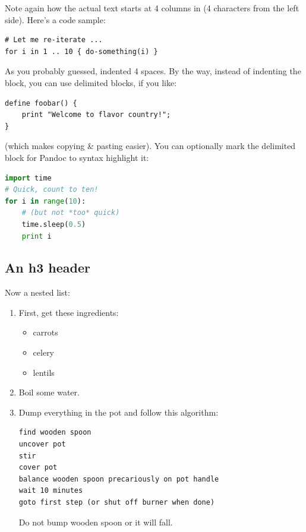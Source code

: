\documentclass[11pt,twoside,makeidx,hidelinks,]{memoir}
\begin{document}
Note again how the actual text starts at 4 columns in (4 characters
from the left side). Here's a code sample:

\begin{verbatim}# Let me re-iterate ...
for i in 1 .. 10 { do-something(i) }
\end{verbatim}

As you probably guessed, indented 4 spaces. By the way, instead of
indenting the block, you can use delimited blocks, if you like:

\begin{verbatim}define foobar() {
    print "Welcome to flavor country!";
}
\end{verbatim}

(which makes copying \& pasting easier). You can optionally mark the
delimited block for Pandoc to syntax highlight it:

\begin{lstlisting}[showspaces=false,showtabs=false,language=python,basicstyle=\ttfamily\footnotesize,columns=fixed,frame=tlbr]
import time
# Quick, count to ten!
for i in range(10):
    # (but not *too* quick)
    time.sleep(0.5)
    print i

\end{lstlisting}   %

\subsection{An h3 header}\hypertarget{an-h3-header}{}\label{an-h3-header}

Now a nested list:

\begin{enumerate}
\item{} First, get these ingredients:

\begin{itemize}
\item{} carrots
\item{} celery
\item{} lentils
\end{itemize}
\item{} Boil some water.
\item{} Dump everything in the pot and follow
this algorithm:

\begin{verbatim}find wooden spoon
uncover pot
stir
cover pot
balance wooden spoon precariously on pot handle
wait 10 minutes
goto first step (or shut off burner when done)
\end{verbatim}

Do not bump wooden spoon or it will fall.
\end{enumerate}
\end{document}
